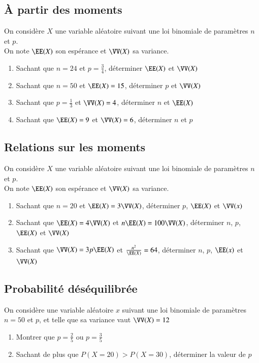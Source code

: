 \documentclass[oneside,12pt]{article}          %
\begin{document}
\subsection{À partir des moments}
On considère $X$ une variable aléatoire suivant une loi binomiale de paramètres $n$ et $p$. \\
On note $\EE(X)$ son espérance et $\VV(X)$ sa variance.
\begin{enumerate}
	\item Sachant que $n=24$ et $p=\frac{3}{4}$, déterminer $\EE(X)$ et $\VV(X)$
	\item Sachant que $n=50$ et $\EE(X)=15$, déterminer $p$ et $\VV(X)$
	\item Sachant que $p=\frac{1}{3}$ et $\VV(X)=4$, déterminer $n$ et $\EE(X)$
	\item Sachant que $\EE(X)=9$ et $\VV(X)=6$, déterminer $n$ et $p$
\end{enumerate}



\subsection{Relations sur les moments}
On considère $X$ une variable aléatoire suivant une loi binomiale de paramètres $n$ et $p$. \\
On note $\EE(X)$ son espérance et $\VV(X)$ sa variance.
\begin{enumerate}
	\item Sachant que $n=20$ et $\EE(X)=3\VV(X)$, déterminer $p$, $\EE(X)$ et $\VV(x)$
	\item Sachant que $\EE(X)=4\VV(X)$ et $n\EE(X)=100\VV(X)$, déterminer $n$, $p$, $\EE(X)$ et $\VV(X)$
	\item Sachant que $\VV(X)=3p\EE(X)$ et $\frac{n^2}{\EE(X)}=64$, déterminer $n$, $p$, $\EE(x)$ et $\VV(X)$
\end{enumerate}



\subsection{Probabilité déséquilibrée}
On considère une variable aléatoire $x$ suivant une loi binomiale de paramètres $n=50$ et $p$, et telle que sa variance vaut $\VV(X)=12$
\begin{enumerate}
	\item Montrer que $p=\frac{2}{5}$ ou $p=\frac{3}{5}$
	\item Sachant de plus que $P(X=20)>P(X=30)$, déterminer la valeur de $p$
\end{enumerate}
\end{document}
